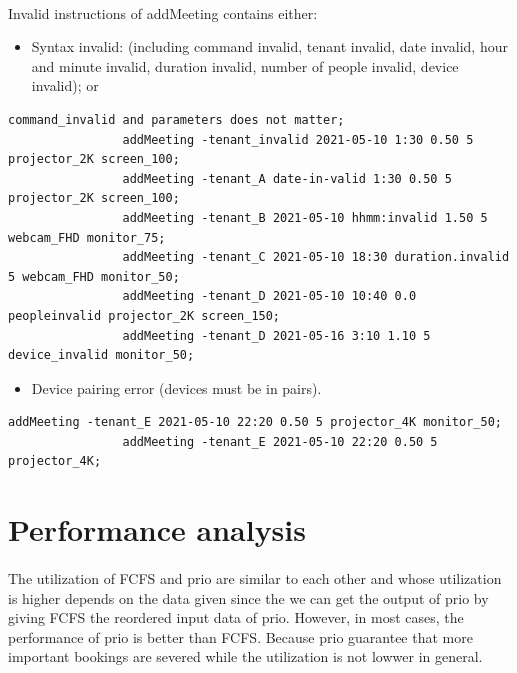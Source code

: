 \documentclass{article}
\begin{document}
            \paragraph{}
            Invalid instructions of addMeeting contains either:
            
            \begin{itemize}
            \item Syntax invalid: (including command invalid, tenant invalid, date invalid, hour and minute invalid,
            duration invalid, number of people invalid, device invalid); or
            \end{itemize}
            
            \begin{Verbatim}[gobble=8]
                command_invalid and parameters does not matter;
                addMeeting -tenant_invalid 2021-05-10 1:30 0.50 5 projector_2K screen_100;
                addMeeting -tenant_A date-in-valid 1:30 0.50 5 projector_2K screen_100;
                addMeeting -tenant_B 2021-05-10 hhmm:invalid 1.50 5 webcam_FHD monitor_75;
                addMeeting -tenant_C 2021-05-10 18:30 duration.invalid 5 webcam_FHD monitor_50;
                addMeeting -tenant_D 2021-05-10 10:40 0.0 peopleinvalid projector_2K screen_150;
                addMeeting -tenant_D 2021-05-16 3:10 1.10 5 device_invalid monitor_50;
            \end{Verbatim}
            \begin{itemize}
            \item Device pairing error (devices must be in pairs).
            \end{itemize}
            \begin{Verbatim}[gobble=8]
                addMeeting -tenant_E 2021-05-10 22:20 0.50 5 projector_4K monitor_50; 
                addMeeting -tenant_E 2021-05-10 22:20 0.50 5 projector_4K; 
            \end{Verbatim}
        

    \cleardoublepage
    \section{Performance analysis}
    \paragraph{}
        The utilization of FCFS and prio are similar to each other and whose utilization is higher depends on the data given since the we can get the output of prio by giving FCFS the reordered input data of prio. However, in most cases, the performance of prio is better than FCFS. Because prio guarantee that more important bookings are severed while the utilization is not lowwer in general.  
\end{document}
